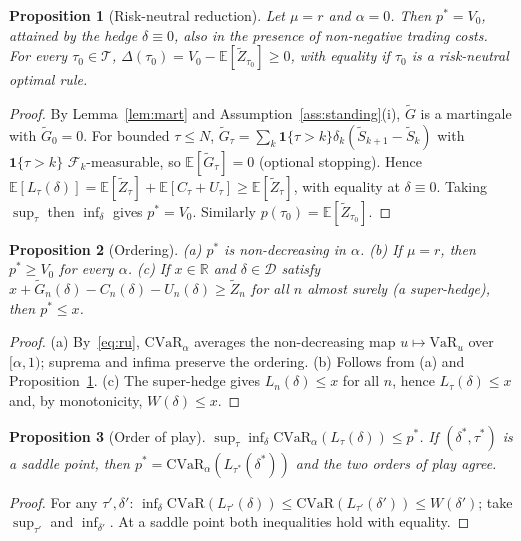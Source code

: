 \documentclass[11pt]{article}
\newtheorem{proposition}{Proposition}
\theoremstyle{definition}
\theoremstyle{remark}
\newcommand{\E}{\mathbb{E}}
\newcommand{\F}{\mathcal{F}}
\newcommand{\T}{\mathcal{T}}
\newcommand{\D}{\mathcal{D}}
\newcommand{\CVaR}{\mathrm{CVaR}}
\newcommand{\VaR}{\mathrm{VaR}}
\newcommand{\St}{\tilde S}
\newcommand{\Zt}{\tilde Z}
\newcommand{\Gt}{\tilde G}
\begin{document}
\begin{proposition}[Risk-neutral reduction]\label{prop:rn}
Let $\mu=r$ and $\alpha=0$. Then $p^*=V_0$, attained by the hedge $\delta\equiv0$, also in the presence of
non-negative trading costs. For every $\tau_0\in\T$, $\Delta(\tau_0)=V_0-\E[\Zt_{\tau_0}]\ge0$, with
equality if $\tau_0$ is a risk-neutral optimal rule.
\end{proposition}
\begin{proof}
By Lemma~\ref{lem:mart} and Assumption~\ref{ass:standing}(i), $\Gt$ is a martingale with $\Gt_0=0$.
For bounded $\tau\le N$, $\Gt_\tau=\sum_k\mathbf 1\{\tau>k\}\delta_k(\St_{k+1}-\St_k)$ with
$\mathbf 1\{\tau>k\}$ $\F_k$-measurable, so $\E[\Gt_\tau]=0$ (optional stopping). Hence
$\E[L_\tau(\delta)]=\E[\Zt_\tau]+\E[C_\tau+U_\tau]\ge\E[\Zt_\tau]$, with equality at $\delta\equiv0$.
Taking $\sup_\tau$ then $\inf_\delta$ gives $p^*=V_0$. Similarly $p(\tau_0)=\E[\Zt_{\tau_0}]$.
\end{proof}

\begin{proposition}[Ordering]\label{prop:order}
(a) $p^*$ is non-decreasing in $\alpha$. (b) If $\mu=r$, then $p^*\ge V_0$ for every $\alpha$.
(c) If $x\in\mathbb R$ and $\delta\in\D$ satisfy $x+\Gt_n(\delta)-C_n(\delta)-U_n(\delta)\ge\Zt_n$ for all
$n$ almost surely (a super-hedge), then $p^*\le x$.
\end{proposition}
\begin{proof}
(a) By~\eqref{eq:ru}, $\CVaR_\alpha$ averages the non-decreasing map $u\mapsto\VaR_u$ over $[\alpha,1)$;
suprema and infima preserve the ordering. (b) Follows from (a) and Proposition~\ref{prop:rn}.
(c) The super-hedge gives $L_n(\delta)\le x$ for all $n$, hence $L_\tau(\delta)\le x$ and, by monotonicity,
$W(\delta)\le x$.
\end{proof}

\begin{proposition}[Order of play]\label{prop:minimax}
$\sup_{\tau}\inf_{\delta}\CVaR_\alpha(L_\tau(\delta))\le p^*$. If $(\delta^*,\tau^*)$ is a saddle point,
then $p^*=\CVaR_\alpha(L_{\tau^*}(\delta^*))$ and the two orders of play agree.
\end{proposition}
\begin{proof}
For any $\tau',\delta'$: $\inf_\delta\CVaR(L_{\tau'}(\delta))\le\CVaR(L_{\tau'}(\delta'))\le W(\delta')$;
take $\sup_{\tau'}$ and $\inf_{\delta'}$. At a saddle point both inequalities hold with equality.
\end{proof}
\end{document}
